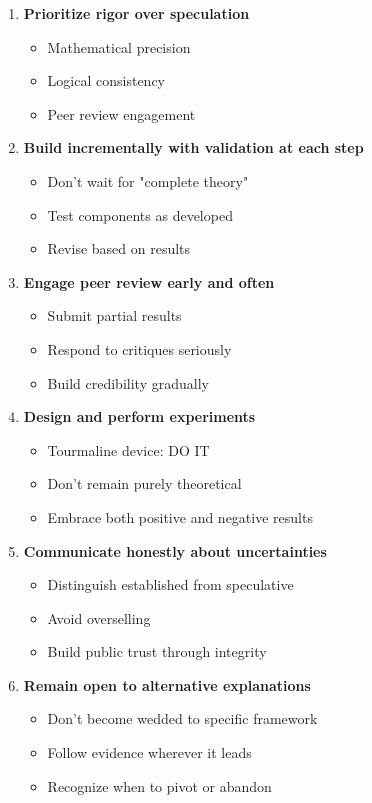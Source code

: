\begin{enumerate}
    \item \textbf{Prioritize rigor over speculation}
    \begin{itemize}
        \item Mathematical precision
        \item Logical consistency
        \item Peer review engagement
    \end{itemize}

    \item \textbf{Build incrementally with validation at each step}
    \begin{itemize}
        \item Don't wait for "complete theory"
        \item Test components as developed
        \item Revise based on results
    \end{itemize}

    \item \textbf{Engage peer review early and often}
    \begin{itemize}
        \item Submit partial results
        \item Respond to critiques seriously
        \item Build credibility gradually
    \end{itemize}

    \item \textbf{Design and perform experiments}
    \begin{itemize}
        \item Tourmaline device: DO IT
        \item Don't remain purely theoretical
        \item Embrace both positive and negative results
    \end{itemize}

    \item \textbf{Communicate honestly about uncertainties}
    \begin{itemize}
        \item Distinguish established from speculative
        \item Avoid overselling
        \item Build public trust through integrity
    \end{itemize}

    \item \textbf{Remain open to alternative explanations}
    \begin{itemize}
        \item Don't become wedded to specific framework
        \item Follow evidence wherever it leads
        \item Recognize when to pivot or abandon
    \end{itemize}


\end{enumerate}
